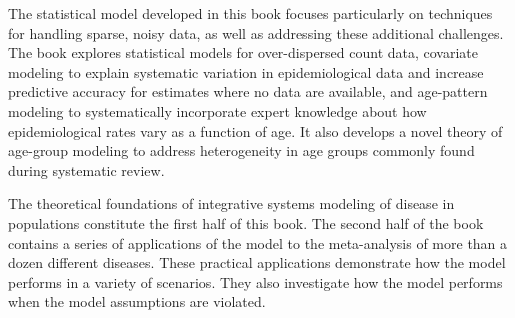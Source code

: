 The statistical model developed in this book focuses
particularly on techniques for handling sparse, noisy data, as well as
addressing these additional challenges.  The book explores statistical
models for over-dispersed count data, covariate modeling to explain
systematic variation in epidemiological data and increase predictive
accuracy for estimates where no data are available, and age-pattern
modeling to systematically incorporate expert knowledge about how
epidemiological rates vary as a function of age.  It also develops a
novel theory of age-group modeling to address heterogeneity in age
groups commonly found during systematic review.

The theoretical foundations of integrative systems modeling of disease
in populations constitute the first half of this book.  The second
half of the book contains a series of applications of the model to the
meta-analysis of more than a dozen different diseases.  These
practical applications demonstrate how the model performs in a variety
of scenarios. They also investigate how the model performs when the
model assumptions are violated.

